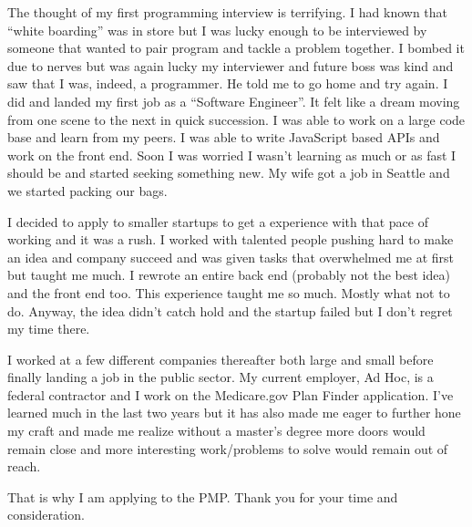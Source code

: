 \documentclass[12pt]{article}
\begin{document}
The thought of my first programming interview is terrifying. I had known that ``white boarding'' was in store but I was lucky enough to be interviewed by someone that wanted to pair program and tackle a problem together. I bombed it due to nerves but was again lucky my interviewer and future boss was kind and saw that I was, indeed, a programmer. He told me to go home and try again. I did and landed my first job as a ``Software Engineer''. It felt like a dream moving from one scene to the next in quick succession. I was able to work on a large code base and learn from my peers. I was able to write JavaScript based APIs and work on the front end. Soon I was worried I wasn't learning as much or as fast I should be and started seeking something new. My wife got a job in Seattle and we started packing our bags. 

I decided to apply to smaller startups to get a experience with that pace of working and it was a rush. I worked with talented people pushing hard to make an idea and company succeed and was given tasks that overwhelmed me at first but taught me much. I rewrote an entire back end (probably not the best idea) and the front end too. This experience taught me so much. Mostly what not to do. Anyway, the idea didn't catch hold and the startup failed but I don't regret my time there.

I worked at a few different companies thereafter both large and small before finally landing a job in the public sector. My current employer, Ad Hoc, is a federal contractor and I work on the Medicare.gov Plan Finder application. I've learned much in the last two years but it has also made me eager to further hone my craft and made me realize without a master's degree more doors would remain close and more interesting work/problems to solve would remain out of reach.

That is why I am applying to the PMP. Thank you for your time and consideration.
\end{document}
